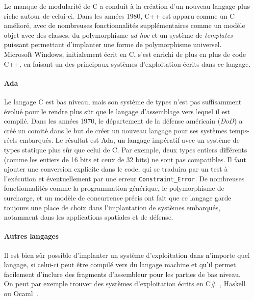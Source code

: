 Le manque de modularité de C a conduit à la création d'un nouveau langage plus
riche autour de celui-ci. Dans les années 1980, C++ est apparu comme un C
amélioré, avec de nombreuses fonctionnalités supplémentaires comme un modèle
objet avec des classes, du polymorphisme \emph{ad hoc} et un système de
\emph{templates} puissant permettant d'implanter une forme de polymorphisme
universel. Microsoft Windows, initialement écrit en C, s'est enrichi de plus en
plus de code C++, en faisant un des principaux systèmes d'exploitation écrits
dans ce langage.

\paragraph{Ada}

Le langage C est bas niveau, mais son système de types n'est pas suffisamment
évolué pour le rendre plus sûr que le langage d'assemblage vers lequel il est
compilé. Dans les années 1970, le département de la défense américain
(\emph{DoD}) a créé un comité dans le but de créer un nouveau langage pour ses
systèmes temps-réels embarqués. Le résultat est Ada, un langage impératif avec
un système de types statique plus sûr que celui de C. Par exemple, deux types
entiers différents (comme les entiers de 16 bits et ceux de 32 bits) ne sont pas
compatibles. Il faut ajouter une conversion explicite dans le code, qui se
traduira par un test à l'exécution et éventuellement par une erreur
\texttt{Constraint\_Error}. De nombreuses fonctionnalités comme la programmation
générique, le polymorphisme de surcharge, et un modèle de concurrence précis ont
fait que ce langage garde toujours une place de choix dans l'implantation de
systèmes embarqués, notamment dans les applications spatiales et de défense.

\paragraph{Autres langages}

Il est bien sûr possible d'implanter un système d'exploitation dans n'importe
quel langage, si celui-ci peut être compilé vers du langage machine et qu'il
permet facilement d'inclure des fragments d'assembleur pour les parties de bas
niveau. On peut par exemple trouver des systèmes d'exploitation écrits en
C\#~\cite{SingularityOverview}, Haskell~\cite{HaskellOS} ou
Ocaml~\cite{unikernels}.



